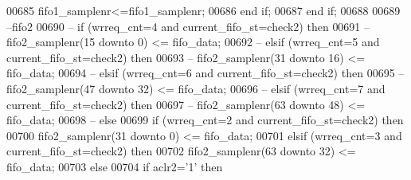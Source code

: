 \begin{DoxyCode}
00685               \textcolor{vhdlchar}{fifo1_samplenr}\textcolor{vhdlchar}{<=}\textcolor{vhdlchar}{fifo1_samplenr};
00686             \textcolor{keywordflow}{end} \textcolor{keywordflow}{if};
00687           \textcolor{keywordflow}{end} \textcolor{keywordflow}{if};
00688           
00689 \textcolor{keyword}{          --fifo2           }
00690 \textcolor{keyword}{--        if (wrreq\_cnt=4 and current\_fifo\_st=check2) then }
00691 \textcolor{keyword}{--          fifo2\_samplenr(15 downto 0) <= fifo\_data;}
00692 \textcolor{keyword}{--        elsif (wrreq\_cnt=5 and current\_fifo\_st=check2) then}
00693 \textcolor{keyword}{--          fifo2\_samplenr(31 downto 16) <= fifo\_data;}
00694 \textcolor{keyword}{--        elsif (wrreq\_cnt=6 and current\_fifo\_st=check2) then}
00695 \textcolor{keyword}{--          fifo2\_samplenr(47 downto 32) <= fifo\_data; }
00696 \textcolor{keyword}{--        elsif (wrreq\_cnt=7 and current\_fifo\_st=check2) then}
00697 \textcolor{keyword}{--          fifo2\_samplenr(63 downto 48) <= fifo\_data; }
00698 \textcolor{keyword}{--        else}
00699           \textcolor{keywordflow}{if} \textcolor{vhdlchar}{(}\textcolor{vhdlchar}{wrreq_cnt}\textcolor{vhdlchar}{=}\textcolor{vhdllogic}{}\textcolor{vhdllogic}{2} \textcolor{keywordflow}{and} \textcolor{vhdlchar}{current_fifo_st}\textcolor{vhdlchar}{=}\textcolor{vhdlchar}{check2}\textcolor{vhdlchar}{)} \textcolor{keywordflow}{then} 
00700             \textcolor{vhdlchar}{fifo2_samplenr}\textcolor{vhdlchar}{(}\textcolor{vhdllogic}{}\textcolor{vhdllogic}{31} \textcolor{keywordflow}{downto} \textcolor{vhdllogic}{}\textcolor{vhdllogic}{0}\textcolor{vhdlchar}{)} \textcolor{vhdlchar}{<=} \textcolor{vhdlchar}{fifo_data};
00701           \textcolor{keywordflow}{elsif} \textcolor{vhdlchar}{(}\textcolor{vhdlchar}{wrreq_cnt}\textcolor{vhdlchar}{=}\textcolor{vhdllogic}{}\textcolor{vhdllogic}{3} \textcolor{keywordflow}{and} \textcolor{vhdlchar}{current_fifo_st}\textcolor{vhdlchar}{=}\textcolor{vhdlchar}{check2}\textcolor{vhdlchar}{)} \textcolor{keywordflow}{then}
00702             \textcolor{vhdlchar}{fifo2_samplenr}\textcolor{vhdlchar}{(}\textcolor{vhdllogic}{}\textcolor{vhdllogic}{63} \textcolor{keywordflow}{downto} \textcolor{vhdllogic}{}\textcolor{vhdllogic}{32}\textcolor{vhdlchar}{)} \textcolor{vhdlchar}{<=} \textcolor{vhdlchar}{fifo_data}; 
00703           \textcolor{keywordflow}{else}
00704             \textcolor{keywordflow}{if} \textcolor{vhdlchar}{aclr2}\textcolor{vhdlchar}{=}\textcolor{vhdlchar}{'}\textcolor{vhdllogic}{}\textcolor{vhdllogic}{1}\textcolor{vhdlchar}{'} \textcolor{keywordflow}{then} 

\end{DoxyCode}
